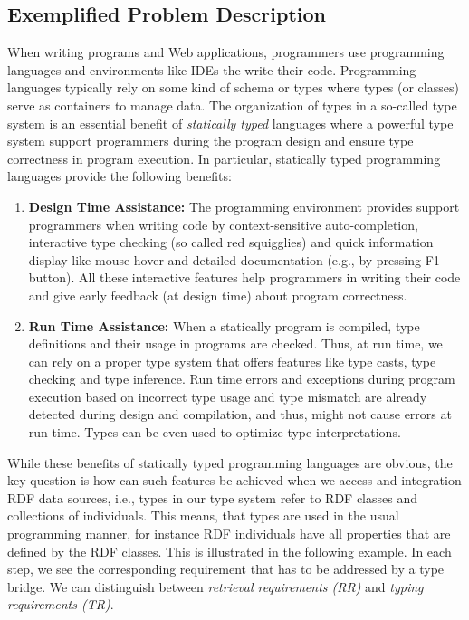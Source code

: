 \documentclass{llncs} %
\newcommand{\ggr}[1]{} %
\begin{document}
\subsection{Exemplified Problem Description}

When writing programs and Web applications, programmers use programming languages and environments like IDEs
the write their code. 
Programming languages typically rely on some kind of schema or types
where types (or classes) serve as containers to manage data.
The organization of types in a so-called type system is an essential benefit of \emph{statically typed} languages where a powerful type system support programmers during the program design and 
ensure type correctness in program execution. In particular, statically typed programming languages provide the following benefits:


\begin{enumerate}
	\item \textbf{Design Time Assistance:} The programming environment provides support programmers when writing code by
	 context-sensitive auto-completion, interactive type checking (so called red squigglies) and quick information display like mouse-hover
	and detailed documentation (e.g., by pressing F1 button). All these interactive features help programmers in writing their code
	and give early feedback (at design time) about program correctness. 
	\item \textbf{Run Time Assistance:} When a statically program is compiled, type definitions and their usage in programs
	        are checked. Thus, at run time, we can rely on a proper type system that offers features like type casts,
					 type checking and type inference. Run time errors and exceptions during program execution based on
					 incorrect type usage and type mismatch are already detected during design and compilation, and thus, might not
					cause errors at run time. Types can be even used to optimize type interpretations.
					\ggr{I can't remember what the last sentence about optimize / drive interpretations mean.}
					
\end{enumerate}

While these benefits of statically typed programming languages are obvious,
the key question is how can such features be achieved when we access and integration RDF data sources,
i.e., types in our type system refer to RDF classes and collections of individuals.
This means, that types are used in the usual programming manner, for instance RDF individuals
have all properties that are defined by the RDF classes. This is illustrated in the following example.
In each step, we see the corresponding requirement that has to be addressed by a type bridge.
We can distinguish between \emph{retrieval requirements (RR)} and \emph{typing requirements (TR)}.
\end{document}
